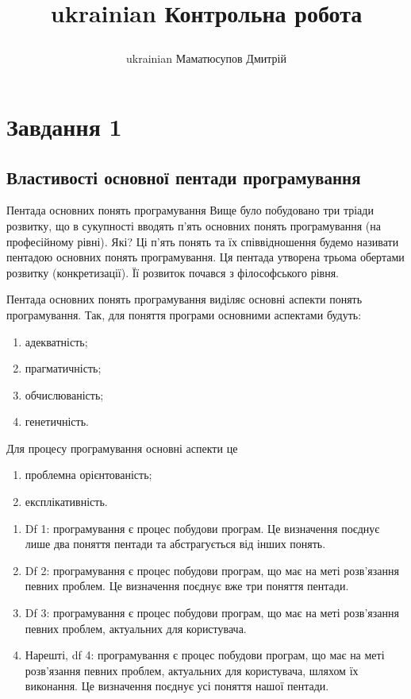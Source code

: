 \documentclass[a4paper,12pt, titlepage]{article}
\title{\begin{otherlanguage*}{ukrainian}
           Контрольна робота
\end{otherlanguage*}}
\author{\begin{otherlanguage*}{ukrainian} Маматюсупов Дмитрій \end{otherlanguage*}}
\date{\begin{otherlanguage*}{ukrainian} Листопад 2020 \end{otherlanguage*}}
\begin{document}
    \maketitle

    \tableofcontents

    \section*{Завдання 1}
    \subsection*{Властивості основної пентади програмування}
    Пентада основних понять програмування
    Вище було побудовано три тріади розвитку, що в
    сукупності вводять п’ять основних понять
    програмування (на професійному рівні).
    Які?
    Ці п’ять понять та їх співвідношення будемо називати
    пентадою основних понять програмування. Ця пентада
    утворена трьома обертами розвитку (конкретизації). Її
    розвиток почався з філософського рівня.

    Пентада основних понять програмування виділяє
    основні аспекти понять програмування. Так, для
    поняття програми основними аспектами будуть:
    \begin{enumerate}
        \item адекватність;
        \item прагматичність;
        \item обчислюваність;
        \item генетичність.
    \end{enumerate}
    Для процесу програмування основні аспекти це
    \begin{enumerate}
        \item проблемна орієнтованість;
        \item експлікативність.
    \end{enumerate}

    \begin{enumerate}
        \item Df 1: програмування є процес побудови програм. Це
        визначення поєднує лише два поняття пентади та
        абстрагується від інших понять.
        \item Df 2: програмування є процес побудови програм, що має
        на меті розв’язання певних проблем. Це визначення
        поєднує вже три поняття пентади.
        \item Df 3: програмування є процес побудови програм, що має
        на меті розв’язання певних проблем, актуальних для
        користувача.
        \item Нарешті, df 4: програмування є процес побудови
        програм, що має на меті розв’язання певних проблем,
        актуальних для користувача, шляхом їх виконання. Це
        визначення поєднує усі поняття нашої пентади.
    \end{enumerate}
\end{document}
